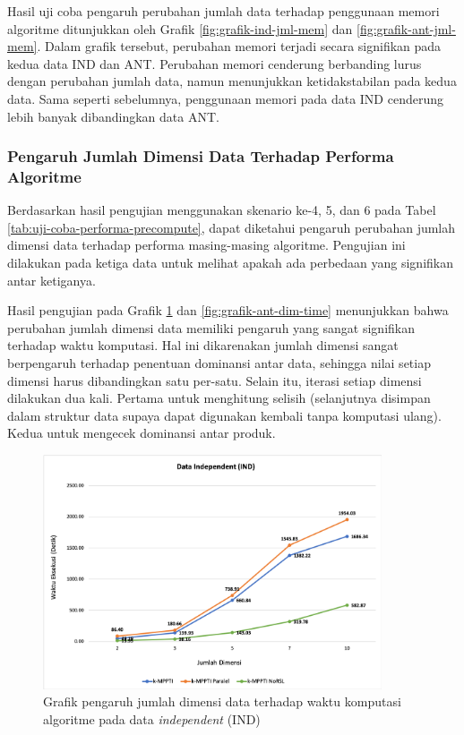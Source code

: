 Hasil uji coba pengaruh perubahan jumlah data terhadap penggunaan memori algoritme ditunjukkan oleh Grafik \ref{fig:grafik-ind-jml-mem} dan \ref{fig:grafik-ant-jml-mem}. Dalam grafik tersebut, perubahan memori terjadi secara signifikan pada kedua data IND dan ANT. Perubahan memori cenderung berbanding lurus dengan perubahan jumlah data, namun menunjukkan ketidakstabilan pada kedua data.
Sama seperti sebelumnya, penggunaan memori pada data IND cenderung lebih banyak dibandingkan data ANT.

\subsubsection{Pengaruh Jumlah Dimensi Data Terhadap Performa Algoritme}

\tab Berdasarkan hasil pengujian menggunakan skenario ke-4, 5, dan 6 pada Tabel \ref{tab:uji-coba-performa-precompute}, dapat diketahui pengaruh perubahan jumlah dimensi data terhadap performa masing-masing algoritme. Pengujian ini dilakukan pada ketiga data untuk melihat apakah ada perbedaan yang signifikan antar ketiganya. 

Hasil pengujian pada Grafik \ref{fig:grafik-ind-dim-time} dan \ref{fig:grafik-ant-dim-time} menunjukkan bahwa perubahan jumlah dimensi data memiliki pengaruh yang sangat signifikan terhadap waktu komputasi. Hal ini dikarenakan jumlah dimensi sangat berpengaruh terhadap penentuan dominansi antar data, sehingga nilai setiap dimensi harus dibandingkan satu per-satu. Selain itu, iterasi setiap dimensi dilakukan dua kali. Pertama untuk menghitung selisih (selanjutnya disimpan dalam struktur data supaya dapat digunakan kembali tanpa komputasi ulang). Kedua untuk mengecek dominansi antar produk.

\begin{figure}[H]
	\centering
	\includegraphics[width=10cm]{assets/img/bab5/grafik-ind-dim-time.png}
	\caption{Grafik pengaruh jumlah dimensi data terhadap waktu komputasi algoritme pada data \textit{independent} (IND)}
	\label{fig:grafik-ind-dim-time}
\end{figure}

